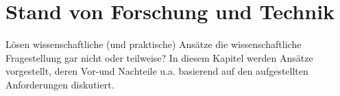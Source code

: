\chapter{Stand von Forschung und Technik}
\label{sec:literaturrecherche}

Lösen wissenschaftliche (und praktische) Ansätze die wissenschaftliche Fragestellung gar nicht oder teilweise? In diesem Kapitel werden Ansätze vorgestellt, deren Vor-und Nachteile u.a. basierend auf den aufgestellten Anforderungen diskutiert.
